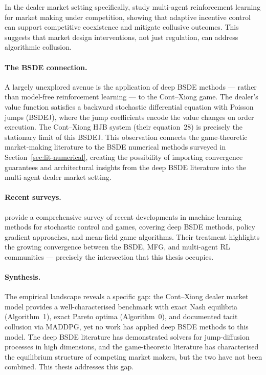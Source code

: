 In the dealer market setting specifically, \citet{wang2025} study
multi-agent reinforcement learning for market making under
competition, showing that adaptive incentive control can support
competitive coexistence and mitigate collusive outcomes.  This
suggests that market design interventions, not just regulation, can
address algorithmic collusion.

\paragraph{The BSDE connection.}
A largely unexplored avenue is the application of deep BSDE methods
--- rather than model-free reinforcement learning --- to the
Cont--Xiong game.  The dealer's value function satisfies a backward
stochastic differential equation with Poisson jumps (BSDEJ), where
the jump coefficients encode the value changes on order execution.
The Cont--Xiong HJB system (their equation~28) is precisely the
stationary limit of this BSDEJ.  This observation connects the
game-theoretic market-making literature to the BSDE numerical methods
surveyed in Section~\ref{sec:lit-numerical}, creating the possibility
of importing convergence guarantees and architectural insights from
the deep BSDE literature into the multi-agent dealer market setting.

\paragraph{Recent surveys.}
\citet{hu2024survey} provide a comprehensive survey of recent
developments in machine learning methods for stochastic control and
games, covering deep BSDE methods, policy gradient approaches, and
mean-field game algorithms.  Their treatment highlights the growing
convergence between the BSDE, MFG, and multi-agent RL communities ---
precisely the intersection that this thesis occupies.

\paragraph{Synthesis.}
The empirical landscape reveals a specific gap: the Cont--Xiong
dealer market model provides a well-characterised benchmark with
exact Nash equilibria (Algorithm~1), exact Pareto optima
(Algorithm~0), and documented tacit collusion via MADDPG, yet no
work has applied deep BSDE methods to this model.  The deep BSDE
literature has demonstrated solvers for jump-diffusion processes in
high dimensions, and the game-theoretic literature has characterised
the equilibrium structure of competing market makers, but the two
have not been combined.  This thesis addresses this gap.


